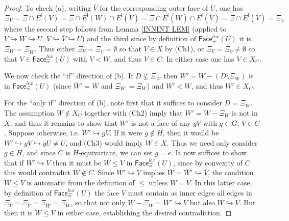 \documentclass[a4paper,10pt,draft]{article}%
\begin{document}
\begin{proof}
To check (a), writing $\bar{V}$ for the corresponding outer face of $U$, one has
	\[
	\Xi_V = \Xi \cap E^{\mathsf{i}} (V) 
	= \Xi \cap E^{\mathsf{i}}(W) \cap E^{\mathsf{i}}(\bar{V})
	= \Xi \cap E^{\mathsf{i}}(\bar{W}) \cap E^{\mathsf{i}}(\bar{V})
	= \Xi \cap E^{\mathsf{i}}(\bar{V})
	= \Xi_{\bar{V}}
	\]
where the second step follows from Lemma \ref{INNINT LEM}
(applied to $V \hookrightarrow W \hookrightarrow U$, 
$V \hookrightarrow \bar{V} \hookrightarrow U$)
and the third since by definition of
$\mathsf{Face}_{\Xi}^{lex}(U)$ it is $\Xi_{W} = \Xi_{\bar{W}}$.
Thus either $\Xi_V= \Xi_{\bar{V}} = \emptyset$ so that $\bar{V}\in X$ by (Ch1),
or $\Xi_V = \Xi_{\bar{V}} \neq \emptyset$
so that $V \in \mathsf{Face}_{\Xi}^{lex}(U)$ with $V<W$, and thus $V\in C$. In either case one has $V \in X_C$.

We now check the ``if'' direction of (b).
If $D \not \subseteq \Xi_{W}$
then $W' = W - (D \setminus \Xi_{W})$
is in $\mathsf{Face}_{\Xi}^{lex}(U)$
(since $\bar{W}' = \bar{W}$ and $\Xi_{W'} = \Xi_{W}$)
and $W'<W$, and thus $W' \in X_C$.

For the ``only if'' direction of (b), 
note first that it suffices to consider $D = \Xi_W$.
The assumption $W \not \in X_C$ together with (Ch2) imply that
$W'=W-\Xi_{W}$ is not in $X$, and thus it remains to show that 
$W'$ is not a face of any $gV$ with $g\in G$, $V \in C$.
Suppose otherwise, i.e. $W' \hookrightarrow gV$.
If it were $g \not \in H$, 
then it would be $W' \hookrightarrow gV \hookrightarrow g U \neq U$, and (Ch3) would imply $W\in X$. Thus we need only consider $g\in H$, and since $C$ is $H$-equivariant, we can set $g=e$.
It now suffices to show that if $W' \hookrightarrow V$
then it must be $W \leq V$ in $\mathsf{Face}_{\Xi}^{lex}(U)$,
since by convexity of $C$ this would contradict $W \not \in C$.
Since $W' \hookrightarrow V$ implies 
$\bar{W} = \bar{W}' \hookrightarrow \bar{V}$,
the condition $W \leq V$ is automatic from the definition of $\leq$ unless $\bar{W} = \bar{V}$.
In this latter case, by definition of 
$\mathsf{Face}_{\Xi}^{lex}(U)$ the face $V$ must contain as inner edges all edges in 
$\Xi_V=\Xi_{\bar{V}} = \Xi_{\bar{W}} = \Xi_{W}$,
so that not only $W - \Xi_{W} = W' \hookrightarrow V$ but also $W \hookrightarrow V$. But then it is $W \leq V$ in either case, establishing the desired contradiction. 


\end{proof}
\end{document}
